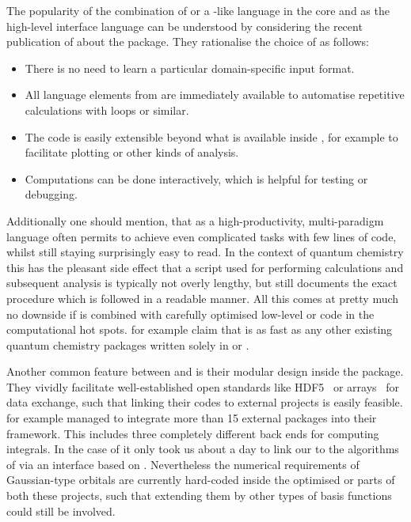 The popularity of the combination of \fortran or a \ccc-like
language in the core and \python as the high-level interface language
can be understood by considering the recent publication of \citet{Sun2017}
about the \pyscf package.
They rationalise the choice of \python as follows:
\begin{itemize}
	\item There is no need to learn a particular domain-specific
		input format.
	\item All language elements from \python are immediately
		available to \eg automatise repetitive calculations
		with loops or similar.
	\item The code is easily extensible beyond what is available
		inside \pyscf, for example to facilitate plotting
		or other kinds of analysis.
	\item Computations can be done interactively,
		which is helpful for testing or debugging.
\end{itemize}
Additionally one should mention,
that \python as a high-productivity, multi-paradigm language
often permits to achieve even complicated tasks with few lines of code,
whilst still staying surprisingly easy to read.
In the context of quantum chemistry
this has the pleasant side effect that a \python script
used for performing calculations and subsequent analysis
is typically not overly lengthy,
but still documents the exact procedure which is followed in a readable manner.
All this comes at pretty much no downside
if \python is combined with
carefully optimised low-level \ccc or \fortran
code in the computational hot spots.
\citet{Sun2017} for example claim that \pyscf is as
fast as any other existing quantum chemistry packages
written solely in \ccc or \fortran.

Another common feature between \pyscf and \psifour
is their modular design inside the package.
They vividly facilitate well-established open standards
like HDF5~\cite{HDF5Manual} or \numpy arrays~\cite{Walt2011}
for data exchange,
such that linking their codes to external projects is easily feasible.
\psifour for example managed to integrate more than 15 external packages
into their framework.
This includes three completely different back ends for computing integrals.
In the case of \pyscf it only took us about a day to link
our \molsturm to the \FCI algorithms of \pyscf
via an interface based on \numpy.
Nevertheless the numerical requirements of Gaussian-type orbitals
are currently hard-coded inside the optimised
\ccc or \cpp parts of both these projects,
such that extending them by other types of basis functions could still be involved.


